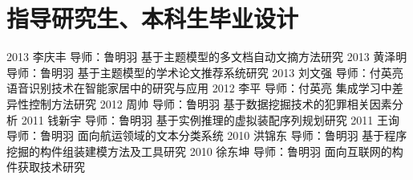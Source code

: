 \documentclass[]{friggeri-cv}
\begin{document}
\section{指导研究生、本科生毕业设计}
\begin{entrylist}
  \entry
    {2013}
    {李庆丰}
    {导师：鲁明羽}
    {基于主题模型的多文档自动文摘方法研究}
  \entry
    {2013}
    {黄泽明}
    {导师：鲁明羽}
    {基于主题模型的学术论文推荐系统研究}
  \entry
    {2013}
    {刘文强}
    {导师：付英亮}
    {语音识别技术在智能家居中的研究与应用}
  \entry
    {2012}
    {李平}
    {导师：付英亮}
    {集成学习中差异性控制方法研究}
  \entry
    {2012}
    {周帅}
    {导师：鲁明羽}
    {基于数据挖掘技术的犯罪相关因素分析}
  \entry
    {2011}
    {钱新宇}
    {导师：鲁明羽}
    {基于实例推理的虚拟装配序列规划研究}
  \entry
    {2011}
    {王询}
    {导师：鲁明羽}
    {面向航运领域的文本分类系统}
  \entry
    {2010}
    {洪锦东}
    {导师：鲁明羽}
    {基于程序挖掘的构件组装建模方法及工具研究}
  \entry
    {2010}
    {徐东坤}
    {导师：鲁明羽}
    {面向互联网的构件获取技术研究}

\end{entrylist}
\end{document}
